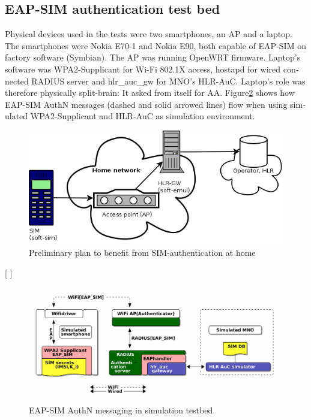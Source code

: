 \documentclass[12pt,a4paper,english]{tutthesis}
\begin{document}
\begin{otherlanguage}{english}
\section{EAP-SIM authentication test bed}
\label{sec-5-1}



Physical devices used in the tests  were two smartphones, an AP and a laptop.
The smartphones were Nokia E70-1 and Nokia E90, both capable of
EAP-SIM on factory software (Symbian). The AP was running OpenWRT firmware.  
Laptop's software was WPA2-Supplicant for Wi-Fi 802.1X access,
hostapd for wired connected RADIUS server and hlr\_auc\_gw for MNO's
HLR-AuC. Laptop's role was therefore physically split-brain: It asked from itself for AA. 
Figure\ref{eap-sim-testbed} shows how EAP-SIM AuthN messages (dashed
and solid arrowed lines) flow when using 
simulated WPA2-Supplicant and HLR-AuC as simulation environment.

\begin{figure}[htb]
\centering
\includegraphics[width=.9\linewidth]{phone-soft-hlr.png}
\caption{\label{fig:sim-pre}Preliminary plan to benefit from SIM-authentication at home}
\end{figure}

[ ] 

\begin{figure}[htb]
\centering
\includegraphics[width=.9\linewidth]{demoinfra.png}
\caption{\label{eap-sim-testbed}EAP-SIM AuthN messaging in simulation testbed}
\end{figure}





\end{otherlanguage}
\end{document}
